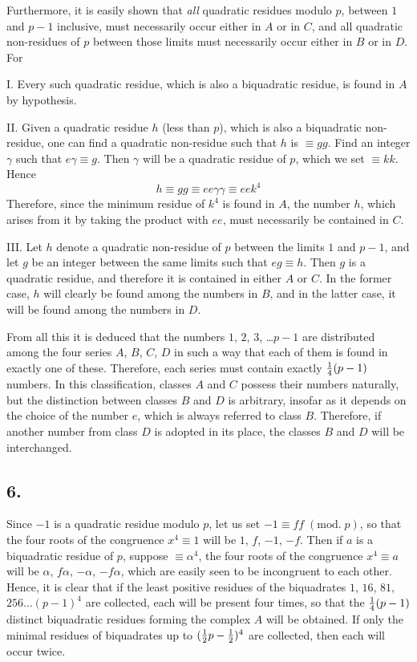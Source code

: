 \documentclass[twoside,12pt]{memoir}
\renewcommand{\pmod}[1]{\;(\textrm{mod.}\;#1)}
\let\oldfrac\frac
\def\frac#1#2{\mathchoice{\tfrac{#1}{#2}}{\oldfrac{#1}{#2}}{\genfrac{}{}{}{2}{#1}{#2\mathstrut}}{\genfrac{}{}{}{3}{#1}{#2\mathstrut}}}
\begin{document}
Furthermore, it is easily shown that \textit{all} quadratic residues modulo \(p\), between \(1\) and \(p-1\) inclusive, must necessarily occur either in \(A\) or in \(C\), and all quadratic non-residues of \(p\) between those limits must necessarily occur either in \(B\) or in \(D\). For
 
I. Every such quadratic residue, which is also a biquadratic residue, is found in \(A\) by hypothesis.
 
II. Given a quadratic residue \(h\) (less than \(p\)), which is also a biquadratic non-residue, one can find a quadratic non-residue such that \(h\) is \(\equiv g g\). Find an integer \(\gamma\) such that \(e \gamma \equiv g\).  Then \(\gamma\) will be a quadratic residue of \(p\), which we set \(\equiv k k\). Hence
\[h \equiv g g \equiv e e \gamma \gamma \equiv e e k^{4}\]
Therefore, since the minimum residue of \(k^{4}\) is found in \(A\), the number \(h\), which arises from it by taking the product with \(e e\), must necessarily be contained in \(C\).
 
III. Let \(h\) denote a quadratic non-residue of \(p\) between the limits \(1\) and \(p-1\), and let \(g\) be an integer between the same limits such that \(e g \equiv h\). Then \(g\) is a quadratic residue, and therefore it is contained in either \(A\) or \(C\). In the former case, \(h\) will clearly be found among the numbers in \(B\), and in the latter case, it will be found among the numbers in \(D\).
%

From all this it is deduced that the numbers \(1\), \(2\), \(3\), \dots \(p-1\) are distributed among the four series \(A\), \(B\), \(C\), \(D\) in such a way that each of them is found in exactly one of these.  Therefore, each series must contain exactly \(\frac{1}{4}(p-1)\) numbers.  In this classification, classes \(A\) and \(C\) possess their numbers naturally, but the distinction between classes \(B\) and \(D\) is arbitrary, insofar as it depends on the choice of the number \(e\), which is always referred to class \(B\).  Therefore, if another number from class \(D\) is adopted in its place, the classes \(B\) and \(D\) will be interchanged.
%

\subsection*{6.}

Since \(-1\) is a quadratic residue modulo \(p\), let us set \(-1 \equiv ff \pmod{p}\), so that the four roots of the congruence \(x^{4} \equiv 1\) will be \(1\), \(f\), \(-1\), \(-f\). Then if \(a\) is a biquadratic residue of \(p\), suppose \(\equiv \alpha^{4}\), the four roots of the congruence \(x^{4} \equiv a\) will be \(\alpha\), \(f \alpha\), \(-\alpha\), \(-f \alpha\), which are easily seen to be incongruent to each other. Hence, it is clear that if the least positive residues of the biquadrates \(1\), \(16\), \(81\), \(256 \ldots (p-1)^{4}\) are collected, each will be present four times, so that the \(\frac{1}{4}(p-1)\) distinct biquadratic residues forming the complex \(A\) will be obtained. If only the minimal residues of biquadrates up to \((\frac{1}{2} p-\frac{1}{2})^{4}\) are collected, then each will occur twice.
%
\end{document}
